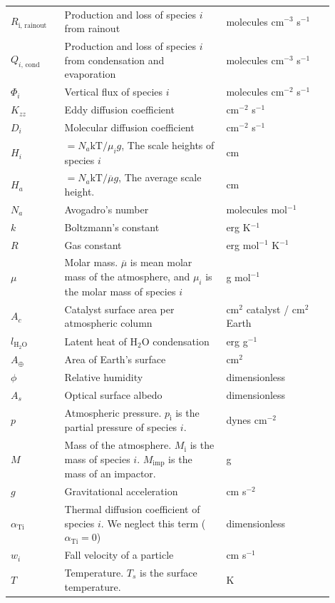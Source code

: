 \begin{spacing}{1.0}
\begin{center}
\begin{tabularx}{\linewidth}{p{0.15\linewidth} | p{0.45\linewidth} | p{0.3\linewidth}}
  $R_{\text{i, rainout}}$ & Production and loss of species $i$ from rainout & molecules cm$^{-3}$ s$^{-1}$
  \\
  $Q_{i\text{, cond}}$ & Production and loss of species $i$ from condensation and evaporation & molecules cm$^{-3}$ s$^{-1}$
  \\
  $\Phi_{i}$ & Vertical flux of species $i$ & molecules cm$^{-2}$ s$^{-1}$ 
  \\
  $K_{zz}$ & Eddy diffusion coefficient & cm$^{-2}$ s$^{-1}$ 
  \\
  $D_{i}$ & Molecular diffusion coefficient & cm$^{-2}$ s$^{-1}$ 
  \\
  $H_{i}$ & $= N_{a}\text{kT}\text{/}\mu_{i}g$, The scale heights of species $i$ & cm 
  \\
  $H_{a}$ & $= N_{a}\text{kT}\text{/}\overline{\mu}g$, The average scale height. & cm 
  \\
  $N_{a}$ & Avogadro's number & molecules mol$^{-1}$ 
  \\
  $k$ & Boltzmann's constant & erg K$^{-1}$ 
  \\
  $R$ & Gas constant & erg mol$^{-1}$ K$^{-1}$ 
  \\
  $\mu$ & Molar mass. $\overline{\mu}$ is mean molar mass of the atmosphere, and $\mu_{i}$ is the molar mass of species $i$ & g mol$^{-1}$ 
  \\
  $A_c$ & Catalyst surface area per atmospheric column & cm$^2$ catalyst / cm$^2$ Earth
  \\
  $l_\mathrm{H_2O}$ & Latent heat of H$_2$O condensation & erg g$^{-1}$ 
  \\
  $A_\oplus$ & Area of Earth's surface & cm$^2$
  \\
  $\phi$ & Relative humidity & dimensionless
  \\
  $A_s$ & Optical surface albedo & dimensionless
  \\
  $p$ & Atmospheric pressure. $p_\mathrm{i}$ is the partial pressure of species $i$. & dynes cm$^{-2}$ 
  \\
  $M$ & Mass of the atmosphere. $M_\mathrm{i}$ is the mass of species $i$. $M_\mathrm{imp}$ is the mass of an impactor. & g
  \\
  $g$ & Gravitational acceleration & cm s$^{-2}$ 
  \\
  $\alpha_{\text{Ti}}$ & Thermal diffusion coefficient of species $i$. We neglect this term ($\alpha_{\text{Ti}} = 0$) & dimensionless
  \\
  $w_i$ & Fall velocity of a particle & cm s$^{-1}$
  \\
  $T$ & Temperature. $T_s$ is the surface temperature. & K 
  \\
  \hline
  \end{tabularx}
\end{center}
\end{spacing}

